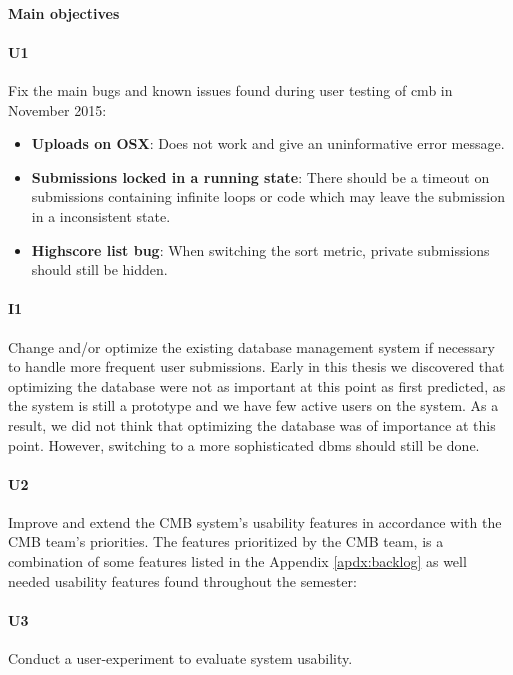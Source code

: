 \paragraph*{Main objectives} \hfill

\paragraph*{U1} Fix the main bugs and known issues found during user testing of \gls{cmb} in November 2015:
  \begin{itemize}
    \item \textbf{Uploads on OSX}: Does not work and give an uninformative error message.
    \item \textbf{Submissions locked in a running state}: There should be a timeout on submissions containing infinite loops or code which may leave the submission in a inconsistent state.
    \item \textbf{Highscore list bug}: When switching the sort metric, private submissions should still be hidden.
  \end{itemize}

\paragraph*{I1} Change and/or optimize the existing database management system if necessary to handle more frequent user submissions. Early in this thesis we discovered that optimizing the database were not as important at this point as first predicted, as the system is still a prototype and we have few active users on the system. As a result, we did not think that optimizing the database was of importance at this point. However, switching to a more sophisticated \gls{dbms} should still be done.

\paragraph*{U2} Improve and extend the CMB system's usability features in accordance with the CMB team's priorities. The features prioritized by the CMB team, is a combination of some features listed in the Appendix \ref{apdx:backlog} as well needed usability features found throughout the semester:


\paragraph*{U3} Conduct a user-experiment to evaluate system usability.

